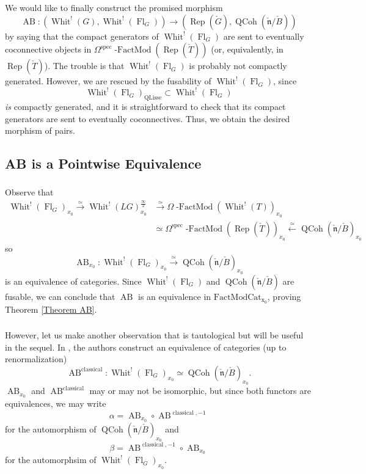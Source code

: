 \documentclass[10pt,a4paper]{amsart}
\newcommand{\on}[1]{\operatorname{#1}}
\newcommand{\Gcheck}{\check{G}}
\newcommand{\ncheck}{\check{\mathfrak{n}}}
\newcommand{\Bcheck}{\check{B}}
\newcommand{\Tcheck}{\check{T}}
\newcommand{\FactModCat}{\on{FactModCat_{x_0}}}
\newcommand{\sssec}[1]{\subsubsection{}}
\begin{document}
\sssec{}
We would like to finally construct the promised morphism
$$
\on{AB}: (\on{Whit}^!(G), \on{Whit}^!(\on{Fl}_G)) \longrightarrow (\on{Rep}(\Gcheck), \on{QCoh}(\ncheck/\Bcheck))
$$
by saying that the compact generators of $\on{Whit}^!(\on{Fl}_G)$ are sent to eventually coconnective objects in $\Omega^{\on{spec}}\on{-FactMod}(\on{Rep}(\Tcheck))$ (or, equivalently, in $\on{Rep}(\Tcheck)$). The trouble is that $\on{Whit}^!(\on{Fl}_G)$ is probably not compactly generated. However, we are rescued by the fusability of $\on{Whit}^!(\on{Fl}_G)$, since
$$
\on{Whit}^!(\on{Fl}_G)_{\on{QLisse}} \subset \on{Whit}^!(\on{Fl}_G)
$$
\emph{is} compactly generated, and it is straightforward to check that its compact generators are sent to eventually coconnectives. Thus, we obtain the desired morphism of pairs.

\subsection{AB is a Pointwise Equivalence} \label{AB is a Pointwise Equivalence}
\sssec{}
Observe that 
\begin{align}
\on{Whit}^!(\on{Fl}_G)_{x_0} \overset{\simeq}{\to} \on{Whit}^!(LG)_{x_0}^{\frac{\infty}{2}} &\overset{\simeq}{\to} \Omega\on{-FactMod}(\on{Whit}^!(T))_{x_0} \\ &\simeq \Omega^{\on{spec}}\on{-FactMod}(\on{Rep}(\Tcheck))_{x_0} \overset{\simeq}{\longleftarrow} \on{QCoh}(\ncheck/\Bcheck)_{x_0}
\end{align}
so 
$$
\on{AB}_{x_0} : \on{Whit}^!(\on{Fl}_G)_{x_0} \overset{\simeq}{\longrightarrow} \on{QCoh}(\ncheck/\Bcheck)_{x_0}
$$
is an equivalence of categories. Since $\on{Whit}^!(\on{Fl}_G)$ and $\on{QCoh}(\ncheck/\Bcheck)$ are fusable, we can conclude that $\on{AB}$ is an equivalence in $\FactModCat$, proving Theorem \ref{Theorem AB}.

\sssec{}
However, let us make another observation that is tautological but will be useful in the sequel. In \cite{AB}, the authors construct an equivalence of categories (up to renormalization)
$$
\on{AB}^{\on{classical}} : \on{Whit}^!(\on{Fl}_G)_{x_0} \simeq \on{QCoh}(\ncheck/\Bcheck)_{x_0}.
$$
$\on{AB}_{x_0}$ and $\on{AB}^{\on{classical}}$ may or may not be isomorphic, but since both functors are equivalences, we may write
$$
\alpha = \on{AB}_{x_0} \circ \on{AB}^{\on{classical}, -1}
$$
for the automorphism of $\on{QCoh}(\ncheck/\Bcheck)_{x_0}$ and
$$
\beta = \on{AB}^{\on{classical}, -1} \circ \on{AB}_{x_0}
$$
for the automorphsim of $\on{Whit}^!(\on{Fl}_G)_{x_0}$.
\end{document}
